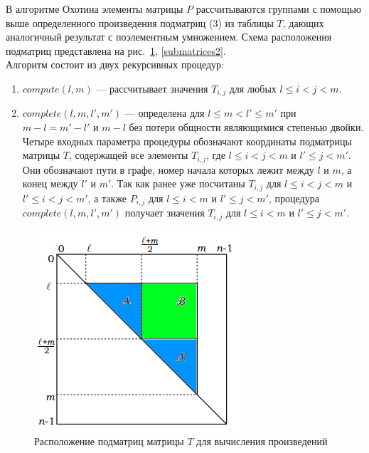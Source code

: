 \documentclass{spbau-diploma}
\begin{document}
\par
В алгоритме Охотина элементы матрицы $P$ рассчитываются
группами с помощью выше определенного произведения
подматриц (3) из таблицы $T$, дающих аналогичный результат с
поэлементным умножением. Схема расположения подматриц
представлена на рис.~\ref{submatrices1},  \ref{submatrices2}.
\\Алгоритм состоит из двух рекурсивных процедур:
\begin{enumerate}
\item $compute(l, m)$ --- рассчитывает значения $T_{i,j}$ для любых $l \le i < j < m$.
\item $complete(l, m, l', m')$ --- определена для $l \le m < l' \le m'$ при $m − l = m' − l'$ и $m - l$ без потери общности являющимися степенью двойки.
\\Четыре входных параметра процедуры обозначают координаты
подматрицы матрицы $T$, содержащей все элементы $T_{i,j}$, где $l \le i < j < m$ и $l' \le j < m'$. Они обозначают пути в графе, номер начала которых лежит между $l$ и $m$, а конец между $l'$ и $m'$. Так как ранее уже посчитаны $T_{i,j}$ для $l \le i < j < m$ и $l' \le i < j < m'$, а также $P_{i,j}$ для $l \le i < m$ и $l' \le j < m'$, процедура $complete(l, m, l', m')$ получает значения $T_{i,j}$ для $l \le i < m$ и $l' \le j < m'$.
\end{enumerate}
\begin{figure}
\centering
\includegraphics{subm1.png}
\caption{Расположение подматриц матрицы $T$ для вычисления произведений}
\label{submatrices1}
\end{figure}
\end{document}
